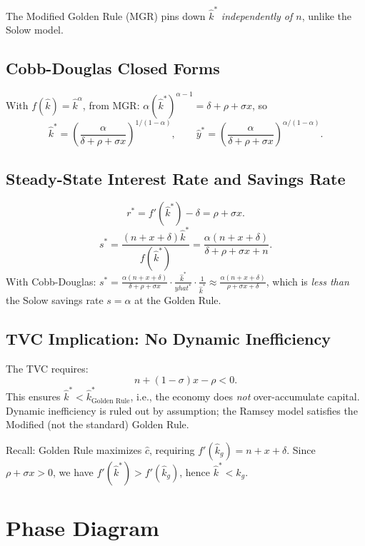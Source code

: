 \documentclass[a4paper,11pt]{article}
\newcommand{\khat}{\hat{k}}
\newcommand{\chat}{\hat{c}}
\newcommand{\yhat}{\hat{y}}
\begin{document}
The Modified Golden Rule (MGR) pins down $\khat^*$ \emph{independently of $n$}, unlike the Solow model.

\subsection*{Cobb-Douglas Closed Forms}
With $f(\khat) = \khat^\alpha$, from MGR: $\alpha (\khat^*)^{\alpha-1} = \delta + \rho + \sigma x$, so
\[
  \khat^* = \left(\frac{\alpha}{\delta + \rho + \sigma x}\right)^{1/(1-\alpha)}, \qquad
  \yhat^* = \left(\frac{\alpha}{\delta + \rho + \sigma x}\right)^{\alpha/(1-\alpha)}.
\]

\subsection*{Steady-State Interest Rate and Savings Rate}
\[
  r^* = f'(\khat^*) - \delta = \rho + \sigma x.
\]
\[
  s^* = \frac{(n+x+\delta)\khat^*}{f(\khat^*)}
      = \frac{\alpha(n+x+\delta)}{\delta + \rho + \sigma x + n}.
\]
With Cobb-Douglas: $s^* = \frac{\alpha(n+x+\delta)}{\delta + \rho + \sigma x} \cdot \frac{\khat^*}{yhat^*} \cdot \frac{1}{\khat^*} \approx \frac{\alpha(n+x+\delta)}{\rho + \sigma x + \delta}$, which is \emph{less than} the Solow savings rate $s = \alpha$ at the Golden Rule.

\subsection*{TVC Implication: No Dynamic Inefficiency}
The TVC requires:
\[
  n + (1-\sigma)x - \rho < 0.
\]
This ensures $\khat^* < \khat^*_{\text{Golden Rule}}$, i.e., the economy does \emph{not} over-accumulate capital. Dynamic inefficiency is ruled out by assumption; the Ramsey model satisfies the Modified (not the standard) Golden Rule.

Recall: Golden Rule maximizes $\chat$, requiring $f'(\khat_g) = n + x + \delta$. Since $\rho + \sigma x > 0$, we have $f'(\khat^*) > f'(\khat_g)$, hence $\khat^* < \khat_g$.

\section{Phase Diagram}
\end{document}
